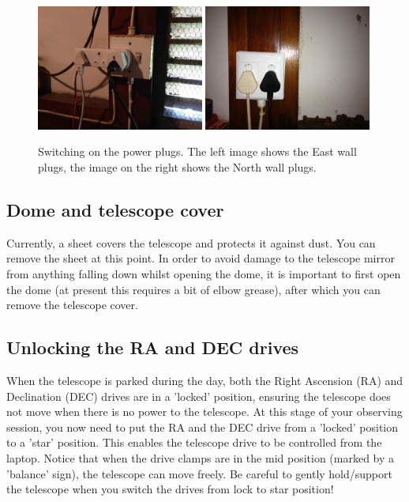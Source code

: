 \documentclass[12pt,twoside,a4paper]{report}
\begin{document}
\begin{figure}[h]
 \centering
    \includegraphics[width=0.49\textwidth]{documentation_images/plugseast}
    \includegraphics[width=0.49\textwidth]{documentation_images/plugsnorth}
    \caption{\label{fig:plugs} Switching on the power plugs. The left image shows the East wall plugs, the
image on the right shows the North wall plugs.}
\end{figure}


\subsection{Dome and telescope cover}

Currently, a sheet covers the telescope and protects it against dust. You can remove the sheet at this point.
In order to avoid damage to the telescope mirror from anything falling down whilst opening the dome, 
it is important to first open the dome (at present this requires a bit of elbow grease), after which 
you can remove the telescope cover. 

\subsection{Unlocking the RA and DEC drives}

When the telescope is parked during the day, both the Right Ascension (RA) and Declination (DEC) drives are 
in a 'locked' position, ensuring the telescope does not move when there is no power to the telescope.
At this stage of your observing session, you now need to put the RA and the DEC drive from a 'locked' position
to a 'star' position. This enables the telescope drive to be controlled from the laptop. 
Notice that when the drive clamps are in the mid position (marked by a 'balance' sign), the telescope 
can move freely. Be careful to gently hold/support the telescope when you switch the drives from 
lock to star position!
\end{document}
